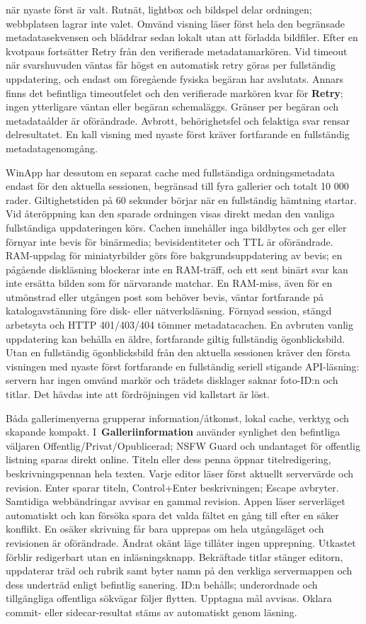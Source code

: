 \documentclass[11pt,a4paper]{article}
\newcommand{\ui}[1]{\textbf{#1}}
\begin{document}
när nyaste först är valt. Rutnät, lightbox och bildspel delar ordningen;
webbplatsen lagrar inte valet. Omvänd visning läser först hela den begränsade
metadatasekvensen och bläddrar sedan lokalt utan att förladda bildfiler.
Efter en kvotpaus fortsätter Retry från den verifierade metadatamarkören. Vid timeout när svarshuvuden väntas får högst en automatisk retry göras per
fullständig uppdatering, och endast om föregående fysiska begäran har avslutats.
Annars finns det befintliga timeoutfelet och den verifierade markören kvar för
\ui{Retry}; ingen ytterligare väntan eller begäran schemaläggs. Gränser per
begäran och metadataålder är oförändrade. Avbrott, behörighetsfel och felaktiga
svar rensar delresultatet. En kall visning med nyaste först kräver fortfarande
en fullständig metadatagenomgång.

WinApp har dessutom en separat cache med fullständiga ordningsmetadata endast
för den aktuella sessionen, begränsad till fyra gallerier och totalt 10 000
rader. Giltighetstiden på 60 sekunder börjar när en fullständig hämtning startar.
Vid återöppning kan den sparade ordningen visas direkt medan den vanliga
fullständiga uppdateringen körs. Cachen innehåller inga bildbytes och ger eller
förnyar inte bevis för binärmedia; bevisidentiteter och TTL är oförändrade.
RAM-uppslag för miniatyrbilder görs före bakgrundsuppdatering av bevis; en
pågående diskläsning blockerar inte en RAM-träff, och ett sent binärt svar kan
inte ersätta bilden som för närvarande matchar. En RAM-miss, även för en utmönstrad eller utgången post som behöver bevis, väntar fortfarande på katalogavstämning före disk- eller nätverksläsning. Förnyad session, stängd
arbetsyta och HTTP 401/403/404 tömmer metadatacachen. En avbruten vanlig
uppdatering kan behålla en äldre, fortfarande giltig fullständig ögonblicksbild.
Utan en fullständig ögonblicksbild från den aktuella sessionen kräver den första
visningen med nyaste först fortfarande en fullständig seriell stigande API-läsning:
servern har ingen omvänd markör och trädets disklager saknar foto-ID:n och titlar.
Det hävdas inte att fördröjningen vid kallstart är löst.

Båda gallerimenyerna grupperar information/åtkomst, lokal cache, verktyg och
skapande kompakt. I~\ui{Galleriinformation} använder synlighet den befintliga
väljaren Offentlig/Privat/Opublicerad; NSFW Guard och undantaget för offentlig listning sparas direkt
online. Titeln eller dess penna öppnar titelredigering, beskrivningspennan hela
texten. Varje editor läser först aktuellt servervärde och revision. Enter sparar
titeln, Control+Enter beskrivningen; Escape avbryter. Samtidiga webbändringar
avvisar en gammal revision. Appen läser serverläget automatiskt och kan försöka
spara det valda fältet en gång till efter en säker konflikt. En osäker skrivning
får bara upprepas om hela utgångsläget och revisionen är oförändrade. Ändrat
okänt läge tillåter ingen upprepning. Utkastet förblir redigerbart utan en
inläsningsknapp. Bekräftade titlar stänger editorn, uppdaterar träd och rubrik
samt byter namn på den verkliga servermappen
och dess underträd enligt befintlig sanering. ID:n behålls; underordnade och
tillgängliga offentliga sökvägar följer flytten. Upptagna mål avvisas. Oklara
commit- eller sidecar-resultat stäms av automatiskt genom läsning.
\end{document}
